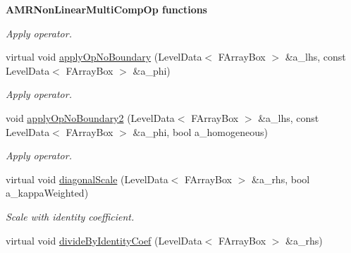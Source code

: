 \begin{Indent}{\bf A\-M\-R\-Non\-Linear\-Multi\-Comp\-Op functions}
\begin{DoxyCompactItemize}
\begin{DoxyCompactList}\small\item\em Apply operator. \end{DoxyCompactList}\item 
\hypertarget{class_a_m_r_non_linear_multi_comp_op_aa6b8a71fa8501fdb71adab30bc7d5295}{virtual void \hyperlink{class_a_m_r_non_linear_multi_comp_op_aa6b8a71fa8501fdb71adab30bc7d5295}{apply\-Op\-No\-Boundary} (Level\-Data$<$ F\-Array\-Box $>$ \&a\-\_\-lhs, const Level\-Data$<$ F\-Array\-Box $>$ \&a\-\_\-phi)}\label{class_a_m_r_non_linear_multi_comp_op_aa6b8a71fa8501fdb71adab30bc7d5295}

\begin{DoxyCompactList}\small\item\em Apply operator. \end{DoxyCompactList}\item 
\hypertarget{class_a_m_r_non_linear_multi_comp_op_a2dba9dd175512b57ac8e2a7d88a0d79c}{void \hyperlink{class_a_m_r_non_linear_multi_comp_op_a2dba9dd175512b57ac8e2a7d88a0d79c}{apply\-Op\-No\-Boundary2} (Level\-Data$<$ F\-Array\-Box $>$ \&a\-\_\-lhs, const Level\-Data$<$ F\-Array\-Box $>$ \&a\-\_\-phi, bool a\-\_\-homogeneous)}\label{class_a_m_r_non_linear_multi_comp_op_a2dba9dd175512b57ac8e2a7d88a0d79c}

\begin{DoxyCompactList}\small\item\em Apply operator. \end{DoxyCompactList}\item 
\hypertarget{class_a_m_r_non_linear_multi_comp_op_a8febdc5604ebbaabbbb09832fe829a24}{virtual void \hyperlink{class_a_m_r_non_linear_multi_comp_op_a8febdc5604ebbaabbbb09832fe829a24}{diagonal\-Scale} (Level\-Data$<$ F\-Array\-Box $>$ \&a\-\_\-rhs, bool a\-\_\-kappa\-Weighted)}\label{class_a_m_r_non_linear_multi_comp_op_a8febdc5604ebbaabbbb09832fe829a24}

\begin{DoxyCompactList}\small\item\em Scale with identity coefficient. \end{DoxyCompactList}\item 
\hypertarget{class_a_m_r_non_linear_multi_comp_op_a9b8f70f0355ad8fe044d132d5235b50d}{virtual void \hyperlink{class_a_m_r_non_linear_multi_comp_op_a9b8f70f0355ad8fe044d132d5235b50d}{divide\-By\-Identity\-Coef} (Level\-Data$<$ F\-Array\-Box $>$ \&a\-\_\-rhs)}\label{class_a_m_r_non_linear_multi_comp_op_a9b8f70f0355ad8fe044d132d5235b50d}


\end{DoxyCompactItemize}
\end{Indent}
